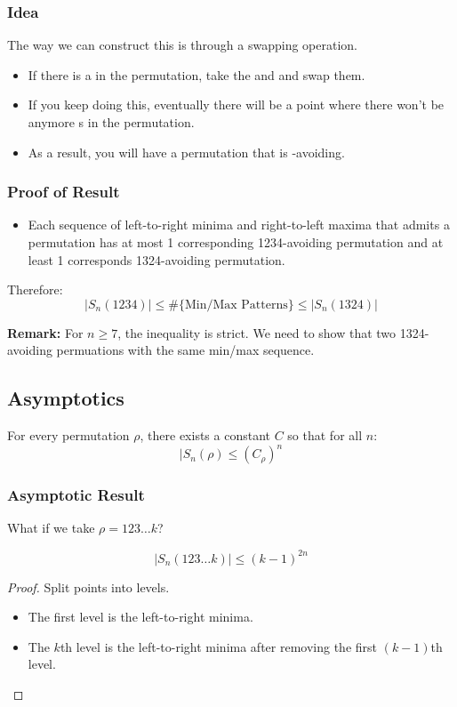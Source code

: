\documentclass[letterpaper]{article}
\begin{document}
\subsubsection{Idea}
The way we can construct this is through a swapping operation. 
\begin{itemize}
    \item If there is a  in the permutation, take the  and  and swap them. 
    \item If you keep doing this, eventually there will be a point where there won't be anymore s in the permutation. 
    \item As a result, you will have a permutation that is -avoiding.
\end{itemize}

\subsubsection{Proof of Result}
\begin{itemize}
    \item Each sequence of left-to-right minima and right-to-left maxima that admits a permutation has at most 1 corresponding 1234-avoiding permutation and at least 1 corresponds 1324-avoiding permutation.
\end{itemize}
Therefore:
\[|S_{n}(1234)| \leq \#\{\text{Min/Max Patterns}\} \leq |S_{n}(1324)|\]

\textbf{Remark:} For $n \geq 7$, the inequality is strict. We need to show that two 1324-avoiding permuations with the same min/max sequence. 

\subsection{Asymptotics}
For every permutation $\rho$, there exists a constant $C$ so that for all $n$:
\[|S_{n}(\rho) \leq (C_{\rho})^n\]

\subsubsection{Asymptotic Result}
What if we take $\rho = 123\dots k$?

\begin{theorem}{}{}
    \[|S_{n}(123\dots k)| \leq (k - 1)^{2n}\]
\end{theorem}

\begin{proof}
    Split points into levels. 
    \begin{itemize}
        \item The first level is the left-to-right minima. 
        \item The $k$th level is the left-to-right minima after removing the first $(k - 1)$th level. \qedhere
    \end{itemize}
\end{proof}
\end{document}
